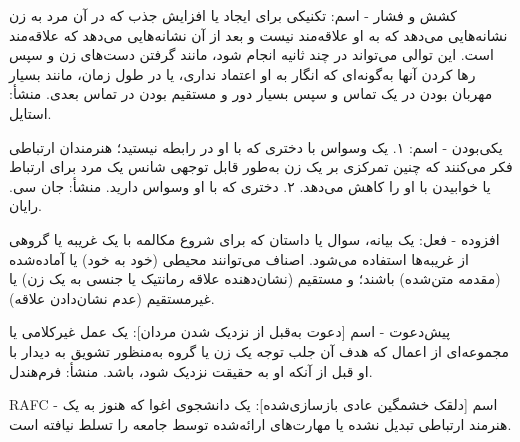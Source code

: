کشش و فشار - اسم: تکنیکی برای ایجاد یا افزایش جذب که در آن مرد به زن نشانه‌هایی می‌دهد که به او علاقه‌مند نیست و بعد از آن نشانه‌هایی می‌دهد که علاقه‌مند است. این توالی می‌تواند در چند ثانیه انجام شود، مانند گرفتن دست‌های زن و سپس رها کردن آنها به‌گونه‌ای که انگار به او اعتماد نداری، یا در طول زمان، مانند بسیار مهربان بودن در یک تماس و سپس بسیار دور و مستقیم بودن در تماس بعدی. منشأ: استایل. 

یکی‌بودن - اسم: ۱. یک وسواس با دختری که با او در رابطه نیستید؛ هنرمندان ارتباطی فکر می‌کنند که چنین تمرکزی بر یک زن به‌طور قابل توجهی شانس یک مرد برای ارتباط یا خوابیدن با او را کاهش می‌دهد. ۲. دختری که با او وسواس دارید. منشأ: جان سی. رایان.

افزوده - فعل: یک بیانه، سوال یا داستان که برای شروع مکالمه با یک غریبه یا گروهی از غریبه‌ها استفاده می‌شود. اصناف می‌توانند محیطی (خود به خود) یا آماده‌شده (مقدمه متن‌شده) باشند؛ و مستقیم (نشان‌دهنده‌ علاقه رمانتیک یا جنسی به یک زن) یا غیرمستقیم (عدم نشان‌دادن علاقه). 

پیش‌دعوت - اسم [دعوت به‌قبل از نزدیک شدن مردان]: یک عمل غیرکلامی یا مجموعه‌ای از اعمال که هدف آن جلب توجه یک زن یا گروه به‌منظور تشویق به دیدار با او قبل از آنکه او به حقیقت نزدیک شود، باشد. منشأ: فرم‌هندل.

RAFC - اسم [دلقک خشمگین عادی بازسازی‌شده]: یک دانشجوی اغوا که هنوز به یک هنرمند ارتباطی تبدیل نشده یا مهارت‌های ارائه‌شده توسط جامعه را تسلط نیافته است.